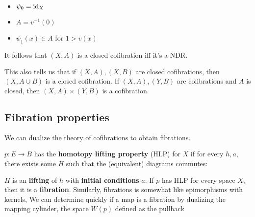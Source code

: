 \begin{itemize}
    \item $\psi_0=\operatorname{id}_X$
    \item $A=v^{-1}(0)$
    \item $\psi_1(x)\in A$ for $1>v(x)$
\end{itemize}

It follows that $(X,A)$ is a closed cofibration iff it's a NDR.

This also tells us that if $(X,A),(X,B)$ are closed cofibrations, then $(X,A\cup B)$ is a closed cofibration. If $(X,A),(Y,B)$ are cofibrations and $A$ is closed, then $(X,A)\times(Y,B)$ is a cofibration.

\subsection{Fibration properties}

We can dualize the theory of cofibrations to obtain fibrations.

$p:E\to B$ has the \textbf{homotopy lifting property} (HLP) for $X$ if for every $h,a$, there exists some $H$ such that the (equivalent) diagrams commutes:

\begin{center}
    \hspace{2cm}
\end{center}

$H$ is an \textbf{lifting} of $h$ with \textbf{initial conditions} $a$. If $p$ has HLP for every space $X$, then it is a \textbf{fibration}. Similarly, fibrations is somewhat like epimorphisms with kernels, We can determine quickly if a map is a fibration by dualizing the mapping cylinder, the space $W(p)$ defined as the pullback

